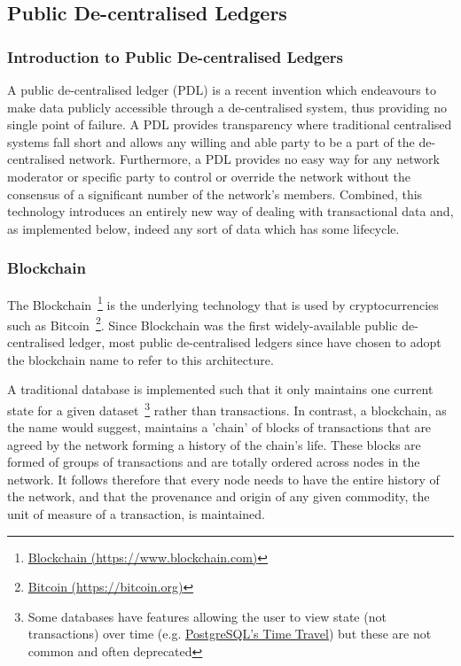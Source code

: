 \subsection{Public De-centralised Ledgers}

\subsubsection{Introduction to Public De-centralised Ledgers}

A public de-centralised ledger (PDL) is a recent invention which endeavours to make data publicly accessible through a de-centralised system, thus providing no single point of failure. A PDL provides transparency where traditional centralised systems fall short and allows any willing and able party to be a part of the de-centralised network. Furthermore, a PDL provides no easy way for any network moderator or specific party to control or override the network without the consensus of a significant number of the network's members. Combined, this technology introduces an entirely new way of dealing with transactional data and, as implemented below, indeed any sort of data which has some lifecycle.


\subsubsection{Blockchain}

The Blockchain~\footnote{\href{https://www.blockchain.com/}{Blockchain (https://www.blockchain.com)}} is the underlying technology that is used by cryptocurrencies such as Bitcoin~\footnote{\href{https://bitcoin.org/en/}{Bitcoin (https://bitcoin.org)}}. Since Blockchain was the first widely-available public de-centralised ledger, most public de-centralised ledgers since have chosen to adopt the blockchain name to refer to this architecture.

A traditional database is implemented such that it only maintains one current state for a given dataset~\footnote{Some databases have features allowing the user to view state (not transactions) over time (e.g. \href{https://www.postgresql.org/docs/6.3/static/c0503.htm}{PostgreSQL's Time Travel}) but these are not common and often deprecated} rather than transactions. In contrast, a blockchain, as the name would suggest, maintains a 'chain' of blocks of transactions that are agreed by the network forming a history of the chain's life. These blocks are formed of groups of transactions and are totally ordered across nodes in the network. It follows therefore that every node needs to have the entire history of the network, and that the provenance and origin of any given commodity, the unit of measure of a transaction, is maintained.

